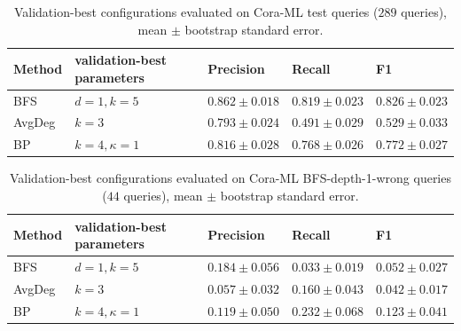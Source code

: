 \begin{table}[H]
  \centering
  \scriptsize
  \caption{Validation-best configurations evaluated on Cora-ML test queries ($289$ queries), mean $\pm$ bootstrap standard error.}
  \label{tab:test}
  \begin{tabular}{lllll}
    \toprule
    Method & validation-best parameters & Precision & Recall & F1 \\
    \midrule
    BFS & $d=1, k=5$ & $0.862\pm0.018$ & $0.819\pm0.023$ & $0.826\pm0.023$ \\
    AvgDeg & $k=3$ & $0.793\pm0.024$ & $0.491\pm0.029$ & $0.529\pm0.033$ \\
    BP & $k=4, \kappa=1$ & $0.816\pm0.028$ & $0.768\pm0.026$ & $0.772\pm0.027$ \\
    \bottomrule
  \end{tabular}
\end{table}

\begin{table}[H]
  \centering
  \scriptsize
  \caption{Validation-best configurations evaluated on Cora-ML BFS-depth-1-wrong queries ($44$ queries), mean $\pm$ bootstrap standard error.}
  \label{tab:hard}
  \begin{tabular}{lllll}
    \toprule
    Method & validation-best parameters & Precision & Recall & F1 \\
    \midrule
    BFS & $d=1, k=5$ & $0.184\pm0.056$ & $0.033\pm0.019$ & $0.052\pm0.027$ \\
    AvgDeg & $k=3$ & $0.057\pm0.032$ & $0.160\pm0.043$ & $0.042\pm0.017$ \\
    BP & $k=4, \kappa=1$ & $0.119\pm0.050$ & $0.232\pm0.068$ & $0.123\pm0.041$ \\
    \bottomrule
  \end{tabular}
\end{table}
